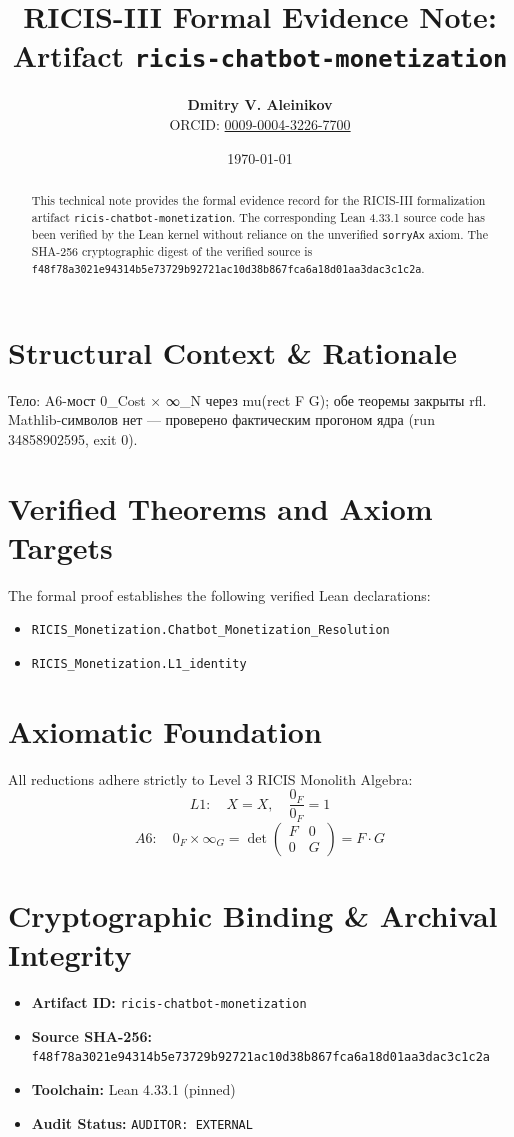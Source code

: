 \documentclass[11pt,a4paper]{article}
\title{\textbf{RICIS-III Formal Evidence Note:\\Artifact \texttt{ricis-chatbot-monetization}}}
\author{\textbf{Dmitry V. Aleinikov}\\ORCID: \href{https://orcid.org/0009-0004-3226-7700}{0009-0004-3226-7700}}
\date{\today}
\begin{document}
\maketitle

\begin{abstract}
This technical note provides the formal evidence record for the RICIS-III formalization artifact \texttt{ricis-chatbot-monetization}.
The corresponding Lean 4.33.1 source code has been verified by the Lean kernel without reliance on the unverified \texttt{sorryAx} axiom.
The SHA-256 cryptographic digest of the verified source is \texttt{f48f78a3021e94314b5e73729b92721ac10d38b867fca6a18d01aa3dac3c1c2a}.
\end{abstract}

\section{Structural Context & Rationale}
Тело: A6-мост 0_Cost × ∞_N через mu(rect F G); обе теоремы закрыты rfl. Mathlib-символов нет — проверено фактическим прогоном ядра (run 34858902595, exit 0).

\section{Verified Theorems and Axiom Targets}
The formal proof establishes the following verified Lean declarations:
\begin{itemize}
  \item \texttt{RICIS_Monetization.Chatbot_Monetization_Resolution}
  \item \texttt{RICIS_Monetization.L1_identity}
\end{itemize}

\section{Axiomatic Foundation}
All reductions adhere strictly to Level 3 RICIS Monolith Algebra:
\begin{equation}
L1: \quad X = X, \quad \frac{0_F}{0_F} = 1
\end{equation}
\begin{equation}
A6: \quad 0_F \times \infty_G = \det\begin{pmatrix} F & 0 \\ 0 & G \end{pmatrix} = F \cdot G
\end{equation}

\section{Cryptographic Binding & Archival Integrity}
\begin{itemize}
  \item \textbf{Artifact ID:} \texttt{ricis-chatbot-monetization}
  \item \textbf{Source SHA-256:} \texttt{f48f78a3021e94314b5e73729b92721ac10d38b867fca6a18d01aa3dac3c1c2a}
  \item \textbf{Toolchain:} Lean 4.33.1 (pinned)
  \item \textbf{Audit Status:} \texttt{AUDITOR: EXTERNAL}
\end{itemize}
\end{document}
